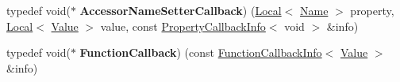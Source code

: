 \begin{DoxyCompactItemize}
\item 
\hypertarget{namespacev8_a476b359c9fc5ad874bcc2a1a21075556}{}typedef void($\ast$ {\bfseries Accessor\+Name\+Setter\+Callback}) (\hyperlink{classv8_1_1Local}{Local}$<$ \hyperlink{classv8_1_1Name}{Name} $>$ property, \hyperlink{classv8_1_1Local}{Local}$<$ \hyperlink{classv8_1_1Value}{Value} $>$ value, const \hyperlink{classv8_1_1PropertyCallbackInfo}{Property\+Callback\+Info}$<$ void $>$ \&info)\label{namespacev8_a476b359c9fc5ad874bcc2a1a21075556}

\item 
\hypertarget{namespacev8_a9eb0624666bb117aea1fb9c9424dcc1b}{}typedef void($\ast$ {\bfseries Function\+Callback}) (const \hyperlink{classv8_1_1FunctionCallbackInfo}{Function\+Callback\+Info}$<$ \hyperlink{classv8_1_1Value}{Value} $>$ \&info)\label{namespacev8_a9eb0624666bb117aea1fb9c9424dcc1b}


\end{DoxyCompactItemize}
